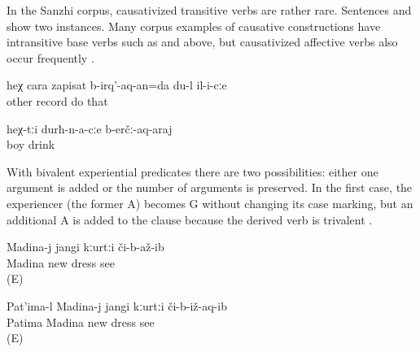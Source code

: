 In the Sanzhi corpus, causativized transitive verbs are rather rare. Sentences  and  show two instances. Many corpus examples of causative constructions have intransitive base verbs such as  and  above, but causativized affective verbs also occur frequently .
%
\begin{exe}
	\ex	\label{ex:‎‎If it is like this, I will also make him record that other (story)}
	\gll	heχ	cara	zapisat	b-irq'-aq-an=da	du-l	il-i-cːe\\
			other	record	do	 that\\
	\glt	{}

	\ex	\label{ex:to make the boys drink}
	\gll	heχ-tːi	durħ-n-a-cːe	b-erčː-aq-araj\\
			boy	drink\\
	\glt	{}
\end{exe}

With bivalent experiential predicates there are two possibilities: either one argument is added or the number of arguments is preserved. In the first case, the experiencer (the former A) becomes G without changing its case marking, but an additional A is added to the clause because the derived verb is trivalent . 
%
\begin{exe}
	\ex	\label{ex:Madina, Patima, and the dress@59}
	\begin{xlist}
		\ex	\label{ex:Madina saw a new dress@59a}
		\gll	Madina-j	jangi	kːurtːi	či-b-až-ib\\
			Madina	new	dress	see\\
		\glt	{} (E)

		\ex	\label{ex:Patima showed Madina a new dress@59b}
		\gll	Pat'ima-l	Madina-j	jangi	kːurtːi	či-b-iž-aq-ib\\
			Patima	Madina	new	dress	see\\
		\glt	{} (E)
	\end{xlist}
\end{exe}

